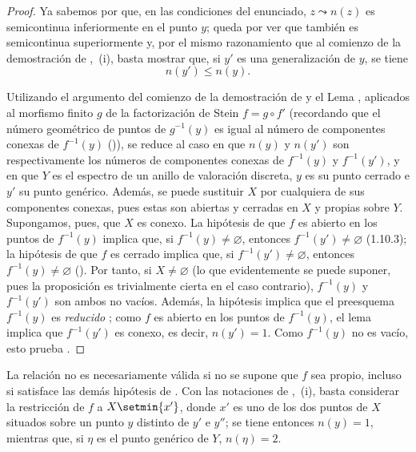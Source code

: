 \begin{proof}
Ya sabemos por  que, en las condiciones del enunciado, $z\leadsto n(z)$ es semicontinua inferiormente en el punto $y$; queda por ver que también es semicontinua superiormente y, por el mismo razonamiento que al comienzo de la demostración de ,~(i), basta mostrar que, si $y'$ es una generalización de $y$, se tiene
\begin{equation}
\tag{15.5.7.1}
\label{IV.15.5.7.1}
  n(y') \leq n(y).
\end{equation}

Utilizando el argumento del comienzo de la demostración de  y el Lema , aplicados al morfismo finito $g$ de la factorización de Stein $f=g\circ f'$ (recordando que el número geométrico de puntos de $g^{-1}(y)$ es igual al número de componentes conexas de $f^{-1}(y)$ ()), se reduce al caso en que $n(y)$ y $n(y')$ son respectivamente los números de componentes conexas de $f^{-1}(y)$ y $f^{-1}(y')$, y en que $Y$ es el espectro de un anillo de valoración discreta, $y$ es su punto cerrado e $y'$ su punto genérico.
Además, se puede sustituir $X$ por cualquiera de sus componentes conexas, pues estas son abiertas y cerradas en $X$ y propias sobre $Y$.
Supongamos, pues, que $X$ es conexo. La hipótesis de que $f$ es abierto en los puntos de $f^{-1}(y)$ implica que, si $f^{-1}(y)\neq\varnothing$, entonces $f^{-1}(y')\neq\varnothing$ (1.10.3); la hipótesis de que $f$ es cerrado implica que, si $f^{-1}(y')\neq\varnothing$, entonces $f^{-1}(y)\neq\varnothing$ ().
Por tanto, si $X\neq\varnothing$ (lo que evidentemente se puede suponer, pues la proposición es trivialmente cierta en el caso contrario), $f^{-1}(y)$ y $f^{-1}(y')$ son ambos no vacíos.
Además, la hipótesis implica que el preesquema $f^{-1}(y)$ es \emph{reducido} ; como $f$ es abierto en los puntos de $f^{-1}(y)$, el lema  implica que $f^{-1}(y')$ es conexo, es decir, $n(y')=1$.
Como $f^{-1}(y)$ no es vacío, esto prueba .
\end{proof}

\begin{remarks}[15.5.8]
\label{IV.15.5.8}
La relación  no es necesariamente válida si no se supone que $f$ sea propio, incluso si satisface las demás hipótesis de .
Con las notaciones de ,~(i), basta considerar la restricción de $f$ a $X\setmin\{x'\}$, donde $x'$ es uno de los dos puntos de $X$ situados sobre un punto $y$ distinto de $y'$ e $y''$; se tiene entonces $n(y)=1$, mientras que, si $\eta$ es el punto genérico de $Y$, $n(\eta)=2$.
\end{remarks}

